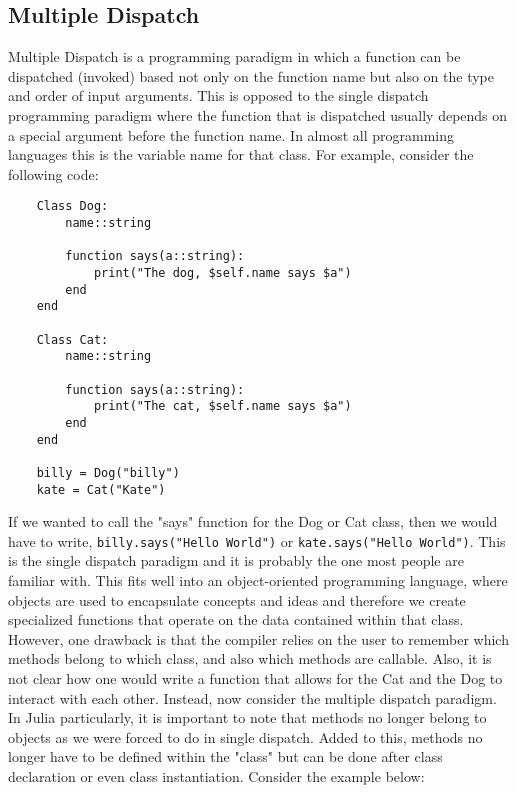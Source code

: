 \subsection{Multiple Dispatch}
Multiple Dispatch is a programming paradigm in which a function can be dispatched (invoked) based not only on the
function name but also on the type and order of input arguments. This is opposed to the single dispatch
programming paradigm where the function that is dispatched usually depends on a special argument before the function
name. In almost all programming languages this is the variable name for that class. For example, consider the following
code: \hfill
\begin{lstlisting}
    Class Dog:
        name::string

        function says(a::string):
            print("The dog, $self.name says $a")
        end
    end

    Class Cat:
        name::string

        function says(a::string):
            print("The cat, $self.name says $a")
        end
    end

    billy = Dog("billy")
    kate = Cat("Kate")
\end{lstlisting}
If we wanted to call the "says" function for the Dog or Cat class, then we would have to write,
\lstinline|billy.says("Hello World")| or \lstinline|kate.says("Hello World")|. This is the single dispatch paradigm and
it is probably the one most people are familiar with. This fits well into an object-oriented programming language, where
objects are used to encapsulate concepts and ideas and therefore we create specialized functions that operate on the data
contained within that class. However, one drawback is that the compiler relies on the user to remember which
methods belong to which class, and also which methods are callable. Also, it is not clear how one would write a function
that allows for the Cat and the Dog to interact with each other. Instead, now consider the multiple dispatch paradigm.
In Julia particularly, it is important to note that methods no longer belong to objects as we were forced to do in
single dispatch. Added to this, methods no longer have to be defined within the "class" but can be done after class
declaration or even class instantiation. Consider the example below: \hfill

